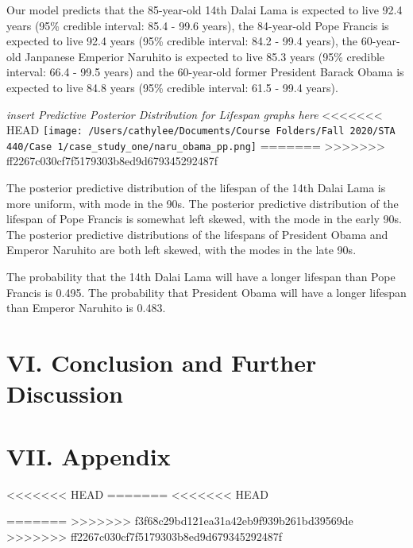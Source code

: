 \documentclass[]{article}
\begin{document}
Our model predicts that the 85-year-old 14th Dalai Lama is expected to
live 92.4 years (95\% credible interval: 85.4 - 99.6 years), the
84-year-old Pope Francis is expected to live 92.4 years (95\% credible
interval: 84.2 - 99.4 years), the 60-year-old Janpanese Emperior
Naruhito is expected to live 85.3 years (95\% credible interval: 66.4 -
99.5 years) and the 60-year-old former President Barack Obama is
expected to live 84.8 years (95\% credible interval: 61.5 - 99.4 years).

\emph{insert Predictive Posterior Distribution for Lifespan graphs here}
<<<<<<< HEAD
\texttt{[image: /Users/cathylee/Documents/Course Folders/Fall 2020/STA 440/Case 1/case\_study\_one/naru\_obama\_pp.png]}
=======
>>>>>>> ff2267c030cf7f5179303b8ed9d679345292487f

The posterior predictive distribution of the lifespan of the 14th Dalai
Lama is more uniform, with mode in the 90s. The posterior predictive
distribution of the lifespan of Pope Francis is somewhat left skewed,
with the mode in the early 90s. The posterior predictive distributions
of the lifespans of President Obama and Emperor Naruhito are both left
skewed, with the modes in the late 90s.

The probability that the 14th Dalai Lama will have a longer lifespan
than Pope Francis is 0.495. The probability that President Obama will
have a longer lifespan than Emperor Naruhito is 0.483.

\hypertarget{vi.-conclusion-and-further-discussion}{%
\section{VI. Conclusion and Further
Discussion}\label{vi.-conclusion-and-further-discussion}}

\hypertarget{vii.-appendix}{%
\section{VII. Appendix}\label{vii.-appendix}}

<<<<<<< HEAD
=======
<<<<<<< HEAD

=======
>>>>>>> f3f68c29bd121ea31a42eb9f939b261bd39569de
>>>>>>> ff2267c030cf7f5179303b8ed9d679345292487f
\end{document}
